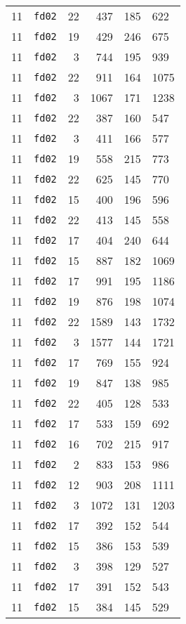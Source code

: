 \documentclass{article}
\begin{document}
\begin{table}[h!]
\begin{tabular}{llrrrl}
    11 & \texttt{fd02} & 22 & 437 & 185 & 622 \\
    11 & \texttt{fd02} & 19 & 429 & 246 & 675 \\
    11 & \texttt{fd02} & 3 & 744 & 195 & 939 \\
    11 & \texttt{fd02} & 22 & 911 & 164 & 1075 \\
    11 & \texttt{fd02} & 3 & 1067 & 171 & 1238 \\
    11 & \texttt{fd02} & 22 & 387 & 160 & 547 \\
    11 & \texttt{fd02} & 3 & 411 & 166 & 577 \\
    11 & \texttt{fd02} & 19 & 558 & 215 & 773 \\
    11 & \texttt{fd02} & 22 & 625 & 145 & 770 \\
    11 & \texttt{fd02} & 15 & 400 & 196 & 596 \\
    11 & \texttt{fd02} & 22 & 413 & 145 & 558 \\
    11 & \texttt{fd02} & 17 & 404 & 240 & 644 \\
    11 & \texttt{fd02} & 15 & 887 & 182 & 1069 \\
    11 & \texttt{fd02} & 17 & 991 & 195 & 1186 \\
    11 & \texttt{fd02} & 19 & 876 & 198 & 1074 \\
    11 & \texttt{fd02} & 22 & 1589 & 143 & 1732 \\
    11 & \texttt{fd02} & 3 & 1577 & 144 & 1721 \\
    11 & \texttt{fd02} & 17 & 769 & 155 & 924 \\
    11 & \texttt{fd02} & 19 & 847 & 138 & 985 \\
    11 & \texttt{fd02} & 22 & 405 & 128 & 533 \\
    11 & \texttt{fd02} & 17 & 533 & 159 & 692 \\
    11 & \texttt{fd02} & 16 & 702 & 215 & 917 \\
    11 & \texttt{fd02} & 2 & 833 & 153 & 986 \\
    11 & \texttt{fd02} & 12 & 903 & 208 & 1111 \\
    11 & \texttt{fd02} & 3 & 1072 & 131 & 1203 \\
    11 & \texttt{fd02} & 17 & 392 & 152 & 544 \\
    11 & \texttt{fd02} & 15 & 386 & 153 & 539 \\
    11 & \texttt{fd02} & 3 & 398 & 129 & 527 \\
    11 & \texttt{fd02} & 17 & 391 & 152 & 543 \\
    11 & \texttt{fd02} & 15 & 384 & 145 & 529 \\

\end{tabular}
\end{table}
\end{document}
